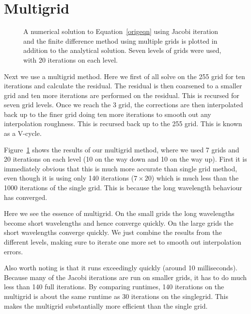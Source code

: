 \documentclass[11pt]{article}
\begin{document}
\section{Multigrid}
\begin{figure}
  \centering

  \caption{A numerical solution to Equation~\ref{origeqn} using Jacobi iteration and the finite difference method using multiple grids is plotted in addition to the analytical solution. Seven levels of grids were used, with 20 iterations on each level.}
  \label{multigrid-plot}
\end{figure}
Next we use a multigrid method. Here we first of all solve on the 255 grid for ten iterations and calculate the residual. The residual is then coarsened to a smaller grid and ten more iterations are performed on the residual. This is recursed for seven grid levels. Once we reach the 3 grid, the corrections are then interpolated back up to the finer grid doing ten more iterations to smooth out any interpolation roughness. This is recursed back up to the 255 grid. This is known as a V-cycle.

Figure~\ref{multigrid-plot} shows the results of our multigrid method, where we used 7 grids and 20 iterations on each level (10 on the way down and 10 on the way up). First it is immediately obvious that this is much more accurate than single grid method, even though it is using only 140 iterations ($7\times 20$) which is much less than the 1000 iterations of the single grid. This is because the long wavelength behaviour has converged.

Here we see the essence of multigrid. On the small grids the long wavelengths become short wavelengths and hence converge quickly. On the large grids the short wavelengths converge quickly. We just combine the results from the different levels, making sure to iterate one more set to smooth out interpolation errors.

Also worth noting is that it runs exceedingly quickly (around 10 milliseconds). Because many of the Jacobi iterations are run on smaller grids, it has to do much less than 140 full iterations. By comparing runtimes, 140 iterations on the multigrid is about the same runtime as 30 iterations on the singlegrid. This makes the multigrid substantially more efficient than the single grid. 
\end{document}
